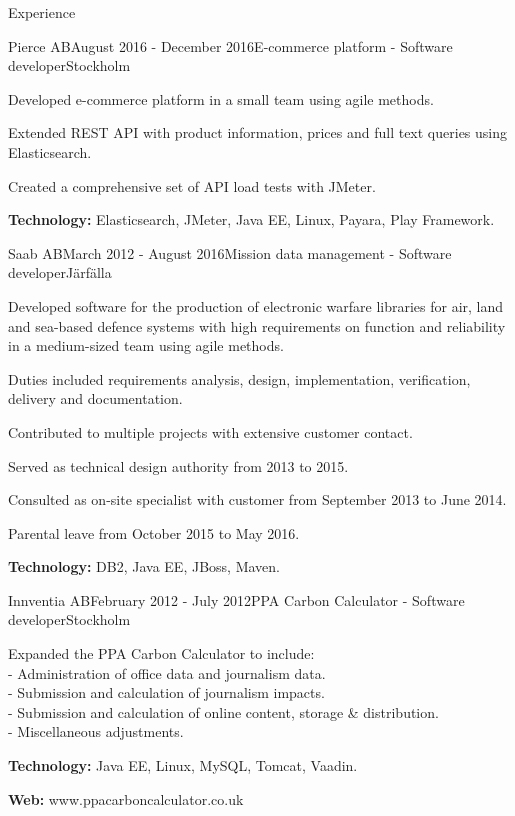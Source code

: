 \documentclass{resume}
\begin{document}
\begin{rSection}{Experience}
    \begin{rSubsection}{Pierce AB}{August 2016 - December 2016}{E-commerce platform - Software developer}{Stockholm}
      \item Developed e-commerce platform in a small team using agile methods.
      \item Extended REST API with product information, prices and full text queries using Elasticsearch.
      \item Created a comprehensive set of API load tests with JMeter.
      \item \textbf{Technology:} Elasticsearch, JMeter, Java EE, Linux, Payara, Play Framework.
    \end{rSubsection}

    \begin{rSubsection}{Saab AB}{March 2012 - August 2016}{Mission data management - Software developer}{Järfälla}
      \item Developed software for the production of electronic warfare libraries for air, land and sea-based defence systems with high requirements on function and reliability in a medium-sized team using agile methods.
      \item Duties included requirements analysis, design, implementation, verification, delivery and documentation.
      \item Contributed to multiple projects with extensive customer contact.
      \item Served as technical design authority from 2013 to 2015.
      \item Consulted as on-site specialist with customer from September 2013 to June 2014.
      \item Parental leave from October 2015 to May 2016.
      \item \textbf{Technology:}  DB2, Java EE, JBoss, Maven.
    \end{rSubsection}

    \begin{rSubsection}{Innventia AB}{February 2012 - July 2012}{PPA Carbon Calculator - Software developer}{Stockholm}
      \item Expanded the PPA Carbon Calculator to include:\\
      - Administration of office data and journalism data. \\
      - Submission and calculation of journalism impacts.\\
      - Submission and calculation of online content, storage \& distribution.\\
      - Miscellaneous adjustments.
      \item \textbf{Technology:}  Java EE, Linux, MySQL, Tomcat, Vaadin.
      \item \textbf{Web:} www.ppacarboncalculator.co.uk
    \end{rSubsection}


\end{rSection}
\end{document}
